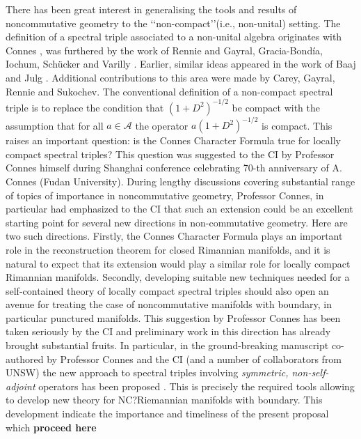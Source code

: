 \documentclass{article}
\begin{document}
There has been great interest in generalising the tools and results of noncommutative geometry to the \lq\lq non-compact\rq\rq (i.e., non-unital) setting. The definition of a spectral triple associated to a non-unital algebra originates with Connes \cite{Connes-reality}, was furthered by the work of Rennie \cite{Rennie}     and Gayral, Gracia-Bond\'ia, Iochum, Sch\"ucker and Varilly \cite{gayral-moyal}. Earlier, similar ideas appeared in the work of Baaj and Julg \cite{Baaj-Julg}. Additional contributions to this area were made by Carey, Gayral, Rennie and Sukochev\cite{CGRS}. The conventional definition  of a non-compact spectral triple is to replace the condition that $(1+D^2)^{-1/2}$ be compact with the assumption that for all $a \in \mathcal{A}$ the operator $a(1+D^2)^{-1/2}$ is compact.
    This raises an important question: is the Connes Character Formula true for locally compact spectral triples? This question was suggested to the CI by Professor Connes himself during Shanghai conference celebrating 70-th anniversary of A. Connes (Fudan University). During {\color{red} lengthy discussions covering substantial range of topics of importance in noncommutative geometry, Professor Connes, in particular had emphasized to the CI} that such an extension could be an excellent starting point for several new directions in non-commutative geometry. {\color{red} Here are two such directions. Firstly, the Connes Character Formula plays  an important role in the reconstruction theorem for closed Rimannian manifolds, and it is natural to expect that its extension would play a similar role for locally compact Rimannian manifolds}. Secondly, developing {\color{red} suitable new techniques needed for a self-contained theory of locally compact spectral triples should also open an avenue for treating the case of noncommutative manifolds with boundary}, in particular punctured manifolds. This suggestion by Professor Connes has been taken seriously by the CI and preliminary work in this direction has already brought substantial fruits. In particular, in the ground-breaking manuscript co-authored by Professor Connes and the CI (and a number of collaborators from UNSW) the new approach to spectral triples involving {\it symmetric, non-self-adjoint} operators has been proposed \cite{Connes_team_symmetric}. This is precisely the required tools allowing to develop new theory for {\color{red} NC?}Riemannian manifolds with boundary. This development indicate the importance and timeliness of the present proposal which {\bf proceed here}
    
\end{document}
